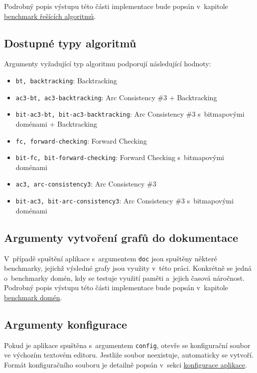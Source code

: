 Podrobný popis výstupu této části implementace bude popsán v~kapitole
\hyperref[sec:timeComplexity]{benchmark řešících algoritmů}.

\subsection*{Dostupné typy algoritmů}
\label{sec:argsAlgs}

Argumenty vyžadující typ algoritmu podporují následující hodnoty:

\begin{itemize}
    \item \texttt{bt, backtracking}: Backtracking
    \item \texttt{ac3-bt, ac3-backtracking}: Arc Consistency \#3 + Backtracking
    \item \texttt{bit-ac3-bt, bit-ac3-backtracking}: Arc Consistency \#3
        s~bitmapovými doménami + Backtracking
    \item \texttt{fc, forward-checking}: Forward Checking
    \item \texttt{bit-fc, bit-forward-checking}: Forward Checking s~bitmapovými
        doménami
    \item \texttt{ac3, arc-consistency3}: Arc Consistency \#3
    \item \texttt{bit-ac3, bit-arc-consistency3}: Arc Consistency \#3
        s~bitmapovými doménami
\end{itemize}

\subsection*{Argumenty vytvoření grafů do dokumentace}

V~případě spuštění aplikace s~argumentem \texttt{doc} jsou spuštěny některé
benchmarky, jejichž výsledné grafy jsou využity v~této práci. Konkrétně se
jedná o~benchmarky domén, kdy se testuje využití paměti a~jejich časová
náročnost. Podrobný popis výstupu této části implementace bude popsán
v~kapitole \hyperref[sec:domain-benchmark]{benchmark domén}.

\subsection*{Argumenty konfigurace}

Pokud je aplikace spuštěna s~argumentem \texttt{config}, otevře se konfigurační
soubor ve výchozím textovém editoru. Jestliže soubor neexistuje, automaticky se
vytvoří. Formát konfiguračního souboru je detailně popsán v~sekci
\hyperref[sec:appConfig]{konfigurace aplikace}.


